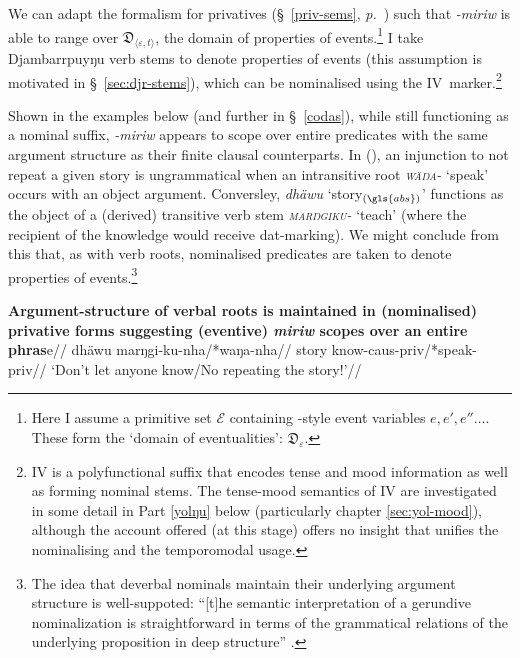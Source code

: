 We can adapt the formalism for privatives (\S~\ref{priv-sems}, \textit{p.}~\pageref{priv-sems}) such that \textit{-miriw} is able to range over $\mathfrak D_{\langle\varepsilon,t\rangle}$, the domain of properties of events.\footnote{Here I assume a primitive set $ \mathcal E $ containing \citeauthor{Davidson1967}-style event variables $ e,e',e''\hdots $. These form the `domain of eventualities': $ \mathfrak D_\varepsilon $.} I take Djambarrpuyŋu verb stems to denote properties of events (this assumption is motivated in \S~\ref{sec:djr-stems}), which can be nominalised using the \gls{IV}~marker.\footnote{\gls{IV} is a polyfunctional suffix that encodes tense and mood information as well as forming nominal stems. The tense-mood semantics of \gls{IV} are investigated in some detail in Part \ref{yolŋu} below (particularly chapter \ref{sec:yol-mood}), although the account offered (at this stage) offers no insight that unifies the nominalising and the temporomodal usage.} 

Shown in the examples below (and further in \S~\ref{codas}), while still functioning as a nominal suffix, \textit{-miriw} appears to scope over entire predicates with the same argument structure as their finite clausal counterparts. In (), an injunction to not repeat a given story is ungrammatical when an intransitive root \textit{\textsc{wäŋa-}} `speak' occurs with an object argument. Conversley, \textit{dhäwu} `story$ _{(\gls{abs})} $' functions as the object of a (derived) transitive verb stem \textit{\textsc{marŋgiku-}} `teach' (where the recipient of the knowledge would receive \gls{dat}-marking). We might conclude from this that, as with verb roots, nominalised predicates are taken to denote properties of events.\footnote{The idea that deverbal nominals maintain their underlying argument structure is well-suppoted: ``[t]he semantic interpretation of a gerundive nominalization is straightforward in terms of the grammatical relations of the underlying proposition in deep structure'' \citep[187]{Chomsky1970}.} 

\pex\begingl\glpreamble \textbf{Argument-structure of verbal roots is maintained in (nominalised) privative forms suggesting (eventive) \textdblhyphen\textit{miriw} scopes over an entire phras}e//
\gla dhäwu marŋgi-ku-nha/*waŋa-nha//
\glb story know-\gls{caus}-\IV\textdblhyphen\gls{priv}/*speak-\IV\textdblhyphen\gls{priv}//
\glft`Don't let anyone know/No repeating the story!'\trailingcitation{[AW~20190502]}//\endgl
\xe

